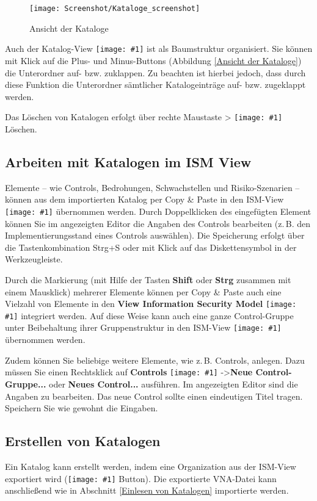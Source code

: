 \documentclass[a4paper,10pt]{book}
\newcommand{\icon}[1]{\texttt{[image: \#1]}}
\begin{document}
\begin{figure}[htb!]
  \centering
  \texttt{[image: Screenshot/Kataloge\_screenshot]}
  \caption{\label{Ansicht der Kataloge} Ansicht der Kataloge}
\end{figure}

Auch der Katalog-View \icon{Icon/bp_catalog} ist als Baumstruktur organisiert.
Sie können mit Klick auf die Plus- und Minus-Buttons (Abbildung \ref{Ansicht
der Kataloge}) die Unterordner auf- bzw. zuklappen.  Zu beachten ist hierbei
jedoch, dass durch diese Funktion die Unterordner sämtlicher Katalogeinträge
auf- bzw. zugeklappt werden.

Das Löschen von Katalogen erfolgt über rechte Maustaste >
\icon{Icon/Delete-Cross} Löschen.

\subsection{Arbeiten mit Katalogen im ISM View}
Elemente -- wie Controls, Bedrohungen, Schwachstellen und Risiko-Szenarien --
können aus dem importierten Katalog per Copy \& Paste in den ISM-View
\icon{Icon/Informationssicherheitsmodell} übernommen werden. Durch
Doppelklicken des eingefügten Element können Sie im angezeigten Editor die
Angaben des Controls bearbeiten (z.\,B. den Implementierungsstand eines
Controls auswählen).  Die Speicherung erfolgt über die Tastenkombination Strg+S
oder mit Klick auf das Diskettensymbol in der Werkzeugleiste.

Durch die Markierung (mit Hilfe der Tasten \textbf{Shift} oder \textbf{Strg}
zusammen mit einem Mausklick) mehrerer Elemente können per Copy \& Paste auch
eine Vielzahl von Elemente in den \textbf{View Information Security Model}
\icon{Icon/Informationssicherheitsmodell.png} integriert werden.  Auf diese
Weise kann auch eine ganze Control-Gruppe unter Beibehaltung ihrer
Gruppenstruktur in den ISM-View \icon{Icon/Informationssicherheitsmodell.png}
übernommen werden.

Zudem können Sie beliebige weitere Elemente, wie z.\,B. Controls, anlegen. Dazu
müssen Sie einen Rechtsklick auf \textbf{Controls}
\icon{Icon/Controls.png} -\textgreater \textbf{Neue
Control-Gruppe...} oder \textbf{Neues Control...} ausführen. Im angezeigten
Editor sind die Angaben zu bearbeiten.  Das neue Control sollte einen
eindeutigen Titel tragen. Speichern Sie wie gewohnt die Eingaben.

\subsection{Erstellen von Katalogen}
Ein Katalog kann erstellt werden, indem eine Organization aus der ISM-View
exportiert wird (\icon{Icon/Export} Button). Die exportierte VNA-Datei kann
anschließend wie in Abschnitt \ref{Einlesen von Katalogen} importierte werden.
\end{document}
